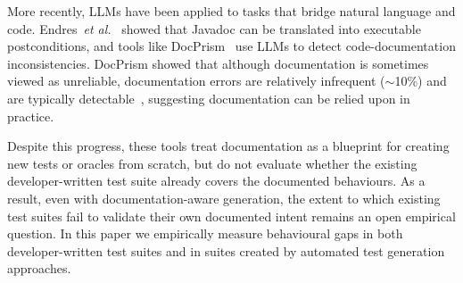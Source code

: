 More recently, LLMs have been applied to tasks that bridge natural language and code. Endres~\textit{et al.}~\cite{Endres2023CanLL} showed that Javadoc can be translated into executable postconditions, and tools like DocPrism~\cite{xu2025docprismlocalcategorizationexternal} use LLMs to detect code-documentation inconsistencies. 
DocPrism showed that although documentation is sometimes viewed as unreliable, documentation errors are relatively infrequent ($\sim$10\%) and are typically detectable~\cite{xu2025docprismlocalcategorizationexternal}, suggesting documentation can be relied upon in practice.

Despite this progress, these tools treat documentation as a blueprint for creating new tests or oracles from scratch, but do not evaluate whether the existing developer-written test suite already covers the documented behaviours. As a result, even with documentation-aware generation, the extent to which existing test suites fail to validate their own documented intent remains an open empirical question. 
In this paper we empirically measure behavioural gaps in both developer-written test suites and in suites created by automated test generation approaches.

